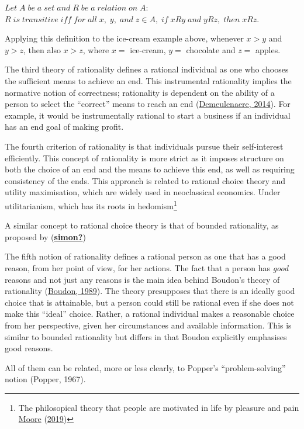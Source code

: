 \documentclass[11pt,preprint, authoryear]{elsarticle}
\numberwithin{equation}{section}
\numberwithin{figure}{section}
\numberwithin{table}{section}
\let\rmarkdownfootnote\footnote%
\def\footnote{\protect\rmarkdownfootnote}
\begin{document}
\(Let \; A \; be \;a\; set \;and\; R\; be \;a \;relation \;on\; A:\)
\newline
\(R\; is \;transitive \;iff \;for \;all \;x, \;y,\; and \; z \in A, \;if\; xRy \;and\; yRz,\; then\; xRz.\)

Applying this definition to the ice-cream example above, whenever
\(x > y\) and \(y > z\), then also \(x > z\), where \(x=\) ice-cream,
\(y=\) chocolate and \(z=\) apples.

The third theory of rationality defines a rational individual as one who
chooses the sufficient means to achieve an end. This instrumental
rationality implies the normative notion of correctness; rationality is
dependent on the ability of a person to select the ``correct'' means to
reach an end (\protect\hyperlink{ref-types}{Demeulenaere, 2014}). For
example, it would be instrumentally rational to start a business if an
individual has an end goal of making profit.

The fourth criterion of rationality is that individuals pursue their
self-interest efficiently. This concept of rationality is more strict as
it imposes structure on both the choice of an end and the means to
achieve this end, as well as requiring consistency of the ends. This
approach is related to rational choice theory and utility maximisation,
which are widely used in neoclassical economics. Under utilitarianism,
which has its roots in hedomism\footnote{The philosopical theory that
  people are motivated in life by pleasure and pain
  \protect\hyperlink{ref-hed}{Moore} (\protect\hyperlink{ref-hed}{2019})}

A similar concept to rational choice theory is that of bounded
rationality, as proposed by
(\protect\hyperlink{ref-simon}{\textbf{simon?}})

The fifth notion of rationality defines a rational person as one that
has a good reason, from her point of view, for her actions. The fact
that a person has \emph{good} reasons and not just any reasons is the
main idea behind Boudon's theory of rationality
(\protect\hyperlink{ref-boudon}{Boudon, 1989}). The theory presupposes
that there is an ideally good choice that is attainable, but a person
could still be rational even if she does not make this ``ideal'' choice.
Rather, a rational individual makes a reasonable choice from her
perspective, given her circumstances and available information. This is
similar to bounded rationality but differs in that Boudon explicitly
emphasises good reasons.

All of them can be related, more or less clearly, to Popper's
``problem-solving'' notion (Popper, 1967).
\end{document}
